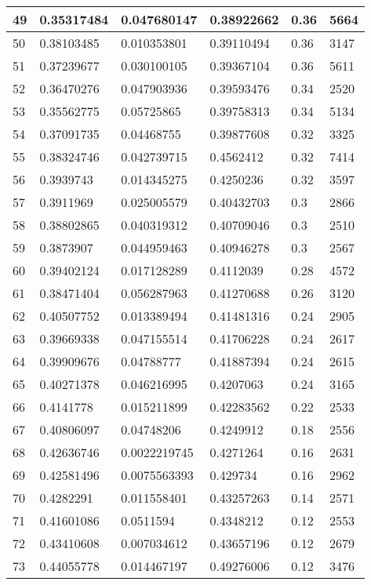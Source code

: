 \begin{longtable}{|l|l|l|l|l|l|}
49 & 0.35317484 & 0.047680147 & 0.38922662 & 0.36 & 5664 \\ \hline 
50 & 0.38103485 & 0.010353801 & 0.39110494 & 0.36 & 3147 \\ \hline 
51 & 0.37239677 & 0.030100105 & 0.39367104 & 0.36 & 5611 \\ \hline 
52 & 0.36470276 & 0.047903936 & 0.39593476 & 0.34 & 2520 \\ \hline 
53 & 0.35562775 & 0.05725865 & 0.39758313 & 0.34 & 5134 \\ \hline 
54 & 0.37091735 & 0.04468755 & 0.39877608 & 0.32 & 3325 \\ \hline 
55 & 0.38324746 & 0.042739715 & 0.4562412 & 0.32 & 7414 \\ \hline 
56 & 0.3939743 & 0.014345275 & 0.4250236 & 0.32 & 3597 \\ \hline 
57 & 0.3911969 & 0.025005579 & 0.40432703 & 0.3 & 2866 \\ \hline 
58 & 0.38802865 & 0.040319312 & 0.40709046 & 0.3 & 2510 \\ \hline 
59 & 0.3873907 & 0.044959463 & 0.40946278 & 0.3 & 2567 \\ \hline 
60 & 0.39402124 & 0.017128289 & 0.4112039 & 0.28 & 4572 \\ \hline 
61 & 0.38471404 & 0.056287963 & 0.41270688 & 0.26 & 3120 \\ \hline 
62 & 0.40507752 & 0.013389494 & 0.41481316 & 0.24 & 2905 \\ \hline 
63 & 0.39669338 & 0.047155514 & 0.41706228 & 0.24 & 2617 \\ \hline 
64 & 0.39909676 & 0.04788777 & 0.41887394 & 0.24 & 2615 \\ \hline 
65 & 0.40271378 & 0.046216995 & 0.4207063 & 0.24 & 3165 \\ \hline 
66 & 0.4141778 & 0.015211899 & 0.42283562 & 0.22 & 2533 \\ \hline 
67 & 0.40806097 & 0.04748206 & 0.4249912 & 0.18 & 2556 \\ \hline 
68 & 0.42636746 & 0.0022219745 & 0.4271264 & 0.16 & 2631 \\ \hline 
69 & 0.42581496 & 0.0075563393 & 0.429734 & 0.16 & 2962 \\ \hline 
70 & 0.4282291 & 0.011558401 & 0.43257263 & 0.14 & 2571 \\ \hline 
71 & 0.41601086 & 0.0511594 & 0.4348212 & 0.12 & 2553 \\ \hline 
72 & 0.43410608 & 0.007034612 & 0.43657196 & 0.12 & 2679 \\ \hline 
73 & 0.44055778 & 0.014467197 & 0.49276006 & 0.12 & 3476 \\ \hline 

\end{longtable}
